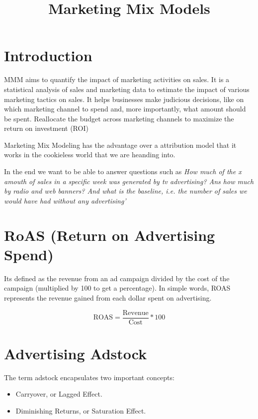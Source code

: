 \documentclass[a4paper, 8pt, twocolumn]{article}
\title{Marketing Mix Models}
\begin{document}
\maketitle

\small
\section{Introduction}
 
MMM aims to quantify the impact of marketing activities on sales.
It is a statistical analysis of sales and marketing data to estimate the impact of various marketing tactics on sales.
It helps businesses make judicious decisions, like on which marketing channel to spend and, more importantly, what amount 
should be spent. Reallocate the budget across marketing channels to maximize the return on investment (ROI)

Marketing Mix Modeling has the advantage over a attribution model that it works in the cookieless world that we are heanding
into.

In the end we want to be able to answer questions such as 
\textit{How much of the x amouth of sales in a specific week was generated by tv advertising?
    Ans how much by radio and web banners? And what is the baseline, i.e. the number of sales we 
    would have had without any advertising'}

\small
\section{RoAS (Return on Advertising Spend)}

Its defined as the revenue from an ad campaign divided by the cost of the campaign (multiplied by 100 to get a percentage).
In simple words, ROAS represents the revenue gained from each dollar spent on advertising.

\begin{equation}
    \text{ROAS} = \frac{\text{Revenue}}{\text{Cost}} * 100
\end{equation}

\section{Advertising Adstock}
The term adstock encapsulates two important concepts:
\begin{itemize}[noitemsep]
    \item Carryover, or Lagged  Effect.
    \item Diminishing Returns, or Saturation Effect.
\end{itemize}
\end{document}
